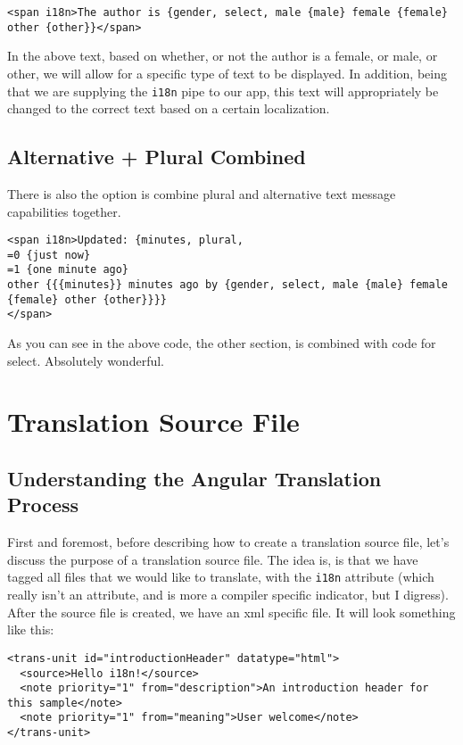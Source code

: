 \begin{lstlisting}
<span i18n>The author is {gender, select, male {male} female {female} other {other}}</span>  
\end{lstlisting}

In the above text, based on whether, or not the author is a female, or male, or 
other, we will allow for a specific type of text to be displayed. In addition,
being that we are supplying the \lstinline{i18n} pipe to our app, this text 
will appropriately be changed to the correct text based on a certain localization.

\subsection{Alternative + Plural Combined}
There is also the option is combine plural and alternative text message capabilities 
together. 
\begin{lstlisting}
<span i18n>Updated: {minutes, plural,
=0 {just now}
=1 {one minute ago}
other {{{minutes}} minutes ago by {gender, select, male {male} female {female} other {other}}}}
</span>
\end{lstlisting}

As you can see in the above code, the other section, is combined with code for
select. Absolutely wonderful. 

\section{Translation Source File}
\subsection{Understanding the Angular Translation Process}
First and foremost, before describing how to create a translation source file,
let's discuss the purpose of a translation source file. The idea is, is that 
we have tagged all files that we would like to translate, with the \lstinline{i18n} 
attribute (which really isn't an attribute, and is more a compiler specific 
indicator, but I digress). After the source file is created, we have an xml 
specific file. It will look something like this: 
\begin{lstlisting}[caption=src/locale/messages.xlf]
<trans-unit id="introductionHeader" datatype="html">
  <source>Hello i18n!</source>
  <note priority="1" from="description">An introduction header for this sample</note>
  <note priority="1" from="meaning">User welcome</note>
</trans-unit>
\end{lstlisting}

